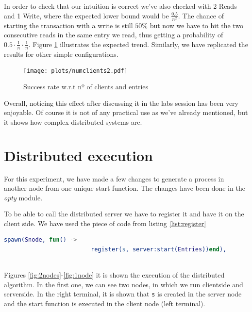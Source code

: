 \documentclass[a4paper, 10pt]{article}
\begin{document}
\clearpage

In order to check that our intuition is correct we've also checked with 2 Reads and 1 Write, where the expected lower bound would be $\displaystyle \frac{0.5}{n^2}$. The chance of starting the transaction with a write is still $50\%$ but now we have to hit the two consecutive reads in the same entry we read, thus getting a probability of $0.5 \cdot \frac{1}{n} \cdot \frac{1}{n}$. Figure \ref{fig:magia2} illustrates the expected trend. Similarly, we have replicated the results for other simple configurations.
\begin{figure}[H]
  \centering
  \texttt{[image: plots/numclients2.pdf]}
    \caption{Success rate w.r.t nº of clients and entries}
    \label{fig:magia2}
\end{figure} 

Overall, noticing this effect after discussing it in the labs session has been very enjoyable. Of course it is not of any practical use as we've already mentioned, but it shows how complex distributed systems are.


\clearpage
\section{Distributed execution}

For this experiment, we have made a few changes to generate a process in another node from one unique start function. The changes have been done in the \textit{opty} module. 

To be able to call the distributed server we have to register it and have it on the client side. We have used the piece of code from listing \ref{list:register}


\begin{minipage}{\textwidth}
  \begin{lstlisting}[language=erlang, caption={Register Distributed Server}, label={list:register}]
    spawn(Snode, fun() -> 
                         register(s, server:start(Entries))end),
  
 	\end{lstlisting}
\end{minipage}

Figures \ref{fig:2nodes}-\ref{fig:1node} it is shown the execution of the distributed algorithm. In the first one, we can see two nodes, in which we run clientside and serverside. In the right terminal, it is shown that \texttt{s} is created in the server node and the start function is executed in the client node (left terminal). 
\end{document}
